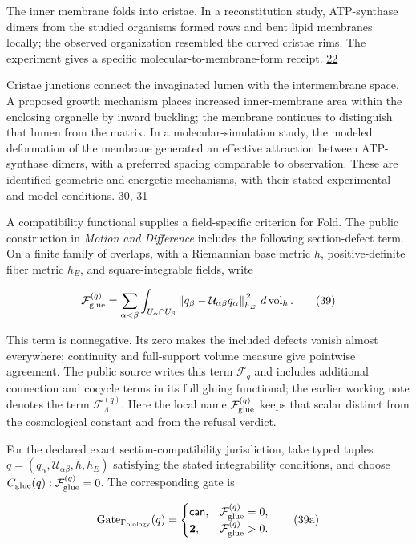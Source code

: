 The inner membrane folds into cristae. In a reconstitution study, ATP-synthase dimers from the studied organisms formed rows and bent lipid membranes locally; the observed organization resembled the curved cristae rims. The experiment gives a specific molecular-to-membrane-form receipt. \href{https://doi.org/10.1073/pnas.1816556116}{22}

Cristae junctions connect the invaginated lumen with the intermembrane space. A proposed growth mechanism places increased inner-membrane area within the enclosing organelle by inward buckling; the membrane continues to distinguish that lumen from the matrix. In a molecular-simulation study, the modeled deformation of the membrane generated an effective attraction between ATP-synthase dimers, with a preferred spacing comparable to observation. These are identified geometric and energetic mechanisms, with their stated experimental and model conditions. \href{https://doi.org/10.1085/jgp.201812033}{30}, \href{https://doi.org/10.1038/ncomms7259}{31}

A compatibility functional supplies a field-specific criterion for Fold. The public construction in \emph{Motion and Difference} includes the following section-defect term. On a finite family of overlaps, with a Riemannian base metric \(h\), positive-definite fiber metric \(h_E\), and square-integrable fields, write

\[
\mathcal F_{\rm glue}^{(q)}
=\sum_{\alpha<\beta}
\int_{U_\alpha\cap U_\beta}
\left\|q_\beta-\mathcal U_{\alpha\beta}q_\alpha
\right\|_{h_E}^{\,2}\,d\operatorname{vol}_{h}.
\tag{39}
\]

This term is nonnegative. Its zero makes the included defects vanish almost everywhere; continuity and full-support volume measure give pointwise agreement. The public source writes this term \(\mathcal F_q\) and includes additional connection and cocycle terms in its full gluing functional; the earlier working note denotes the term \(\mathcal F_\Lambda^{(q)}\). Here the local name \(\mathcal F_{\rm glue}^{(q)}\) keeps that scalar distinct from the cosmological constant and from the refusal verdict.

For the declared exact section-compatibility jurisdiction, take typed tuples \(q=(q_\alpha,\mathcal U_{\alpha\beta},h,h_E)\) satisfying the stated integrability conditions, and choose \(C_{\rm glue}(q):\mathcal F_{\rm glue}^{(q)}=0\). The corresponding gate is

\[
\operatorname{Gate}_{\Gamma_{\rm biology}}(q)=
\begin{cases}
\mathsf{can},&\mathcal F_{\rm glue}^{(q)}=0,\\
\mathbf2,&\mathcal F_{\rm glue}^{(q)}>0.
\end{cases}
\tag{39a}
\]

